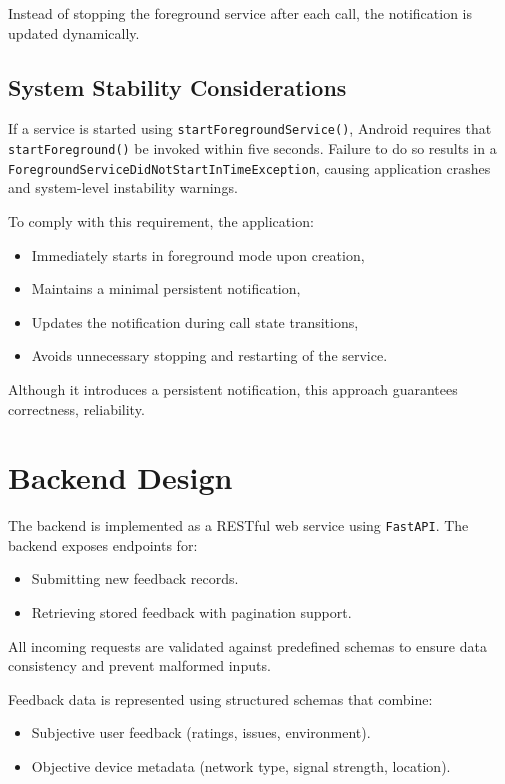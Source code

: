 \documentclass{article}
\theoremstyle{plain}
\theoremstyle{definition}
\theoremstyle{remark}
\begin{document}
Instead of stopping the foreground service after each call, the notification is updated dynamically. 

\subsection{System Stability Considerations}

If a service is started using \texttt{startForegroundService()}, Android requires that \texttt{startForeground()} be invoked within five seconds. Failure to do so results in a \texttt{ForegroundServiceDidNotStartInTimeException}, causing application crashes and system-level instability warnings.

To comply with this requirement, the application:

\begin{itemize}
    \item Immediately starts in foreground mode upon creation,
    \item Maintains a minimal persistent notification,
    \item Updates the notification during call state transitions,
    \item Avoids unnecessary stopping and restarting of the service.
\end{itemize}

Although it introduces a persistent notification, this approach guarantees correctness, reliability.


\section{Backend Design}

The backend is implemented as a RESTful web service using \texttt{FastAPI}. 
The backend exposes endpoints for:
\begin{itemize}
    \item Submitting new feedback records.
    \item Retrieving stored feedback with pagination support.
\end{itemize}
All incoming requests are validated against predefined schemas to ensure data consistency and prevent malformed inputs.

Feedback data is represented using structured schemas that combine:
\begin{itemize}
    \item Subjective user feedback (ratings, issues, environment).
    \item Objective device metadata (network type, signal strength, location).
\end{itemize}
\end{document}

